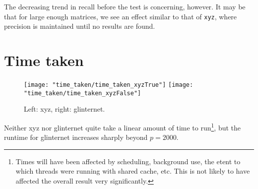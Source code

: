 \documentclass{article}
\begin{document}
The decreasing trend in recall before the test is concerning, however. It may be that for large enough matrices, we see an effect similar to that of \verb|xyz|, where precision is maintained until no results are found.

\section{Time taken}
\begin{figure}[H]
	\begin{minipage}{\linewidth}
		\centering
		\texttt{[image: "time\_taken/time\_taken\_xyzTrue"]}%
		\texttt{[image: "time\_taken/time\_taken\_xyzFalse"]}
	\end{minipage}
	\caption{Left: xyz, right: glinternet.}
\end{figure}
Neither xyz nor glinternet quite take a linear amount of time to run\footnote{Times will have been affected by scheduling, background use, the etent to which threads were running with shared cache, etc. This is not likely to have affected the overall result very significantly.}, but the runtime for glinternet increases sharply beyond $p=2000$.
\end{document}
